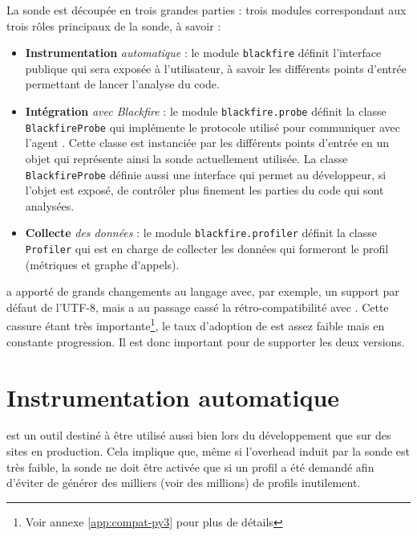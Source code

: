 La sonde est découpée en trois grandes parties : trois modules correspondant aux trois rôles principaux de la sonde, à savoir :
\begin{itemize}
\item \textbf{Instrumentation} \emph{automatique} : le module \texttt{blackfire} définit l'interface publique qui sera exposée à l'utilisateur, à savoir les différents points d'entrée permettant de lancer l'analyse du code.
\item \textbf{Intégration} \emph{avec Blackfire} : le module \texttt{blackfire.probe} définit la classe \\\texttt{BlackfireProbe} qui implémente le protocole utilisé pour communiquer avec l'agent \Blackfire. Cette classe est instanciée par les différents points d'entrée en un objet qui représente ainsi la sonde actuellement utilisée. La classe \texttt{BlackfireProbe} définie aussi une interface qui permet au développeur, si l'objet est exposé, de contrôler plus finement les parties du code qui sont analysées.
\item \textbf{Collecte} \emph{des données} : le module \texttt{blackfire.profiler} définit la classe \texttt{Profiler} qui est en charge de collecter les données qui formeront le profil (\gls{métriques} et \gls{graphe d'appels}).
\end{itemize}

\begin{note}[Python 3]
 a apporté de grands changements au langage avec, par exemple, un support par défaut de l'UTF-8, mais a au passage cassé la rétro-compatibilité avec . Cette cassure étant très importante\footnote{Voir annexe \vref{app:compat-py3} pour plus de détails}, le taux d'adoption de  est assez faible mais en constante progression. Il est donc important pour \Blackfire de supporter les deux versions.
\end{note}

  \chapter[Instrumentation]{Instrumentation automatique}
\Blackfire est un outil destiné à être utilisé aussi bien lors du développement que sur des sites en production. Cela implique que, même si l'\gls{overhead} induit par la sonde est très faible, la sonde ne doit être activée que si un profil a été demandé afin d'éviter de générer des milliers (voir des millions) de profils inutilement.

